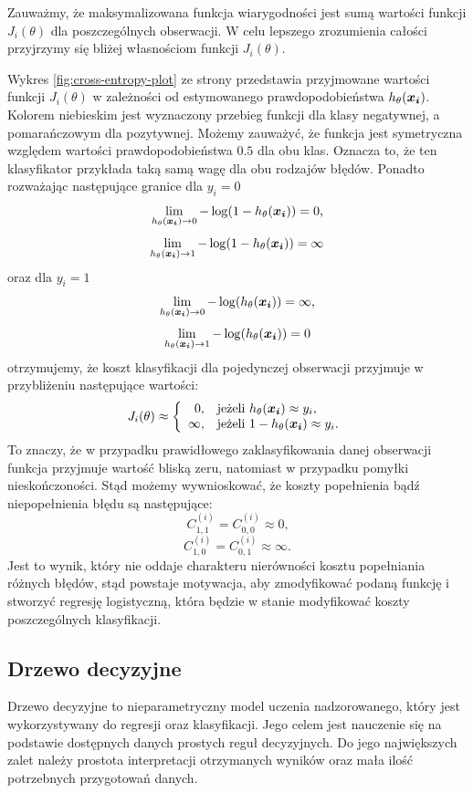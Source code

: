 \documentclass[inzynierska]{pwr_wmat_praca_dyplomowa}
\theoremstyle{plain}
\numberwithin{theorem}{chapter}
\theoremstyle{definition}
\numberwithin{theorem}{chapter}
\begin{document}
Zauważmy, że maksymalizowana funkcja wiarygodności jest sumą wartości funkcji $J_i(\theta)$ dla poszczególnych obserwacji. W celu lepszego zrozumienia całości przyjrzymy się bliżej własnościom funkcji $J_i(\theta)$.

Wykres \ref{fig:cross-entropy-plot} ze strony \pageref{fig:cross-entropy-plot} przedstawia przyjmowane wartości funkcji $J_i(\theta)$ w zależności od estymowanego prawdopodobieństwa $h_{\theta}(\boldsymbol{x_i})$. Kolorem niebieskim jest wyznaczony przebieg funkcji dla klasy negatywnej, a pomarańczowym dla pozytywnej. Możemy zauważyć, że funkcja jest symetryczna względem wartości prawdopodobieństwa $0.5$ dla obu klas. Oznacza to, że ten klasyfikator przykłada taką samą wagę dla obu rodzajów błędów. Ponadto rozważając następujące granice dla $y_i=0$
$$ \lim\limits_{h_{\theta}(\boldsymbol{x_i})\to 0} -\log(1-h_{\theta}(\boldsymbol{x_i})) = 0 \text{,}$$
$$ \lim\limits_{h_{\theta}(\boldsymbol{x_i})\to 1} -\log(1-h_{\theta}(\boldsymbol{x_i})) = \infty $$
oraz dla $y_i=1$
$$ \lim\limits_{h_{\theta}(\boldsymbol{x_i})\to 0} -\log(h_{\theta}(\boldsymbol{x_i})) = \infty \text{,}$$
$$ \lim\limits_{h_{\theta}(\boldsymbol{x_i})\to 1} -\log(h_{\theta}(\boldsymbol{x_i})) = 0 $$
otrzymujemy, że koszt klasyfikacji dla pojedynczej obserwacji przyjmuje w przybliżeniu następujące wartości:
$$
J_i(\theta) \approx \left\{
\begin{array}{rl}
0, &\mbox{jeżeli $h_{\theta}(\boldsymbol{x_i}) \approx y_i$}, \\
\infty, &\mbox{jeżeli $1 - h_{\theta}(\boldsymbol{x_i}) \approx y_i$}.
\end{array}{}
\right.
$$
To znaczy, że w przypadku prawidłowego zaklasyfikowania danej obserwacji funkcja przyjmuje wartość bliską zeru, natomiast w przypadku pomyłki nieskończoności. Stąd możemy wywnioskować, że koszty popełnienia bądź niepopełnienia błędu są następujące:
$$ C^{(i)}_{1,1} = C^{(i)}_{0,0} \approx 0 \text{,}$$
$$ C^{(i)}_{1,0} = C^{(i)}_{0,1} \approx \infty \text{.}$$
Jest to wynik, który nie oddaje charakteru nierówności kosztu popełniania różnych błędów, stąd powstaje motywacja, aby zmodyfikować podaną funkcję i stworzyć regresję logistyczną, która będzie w stanie modyfikować koszty poszczególnych klasyfikacji.

\subsection{Drzewo decyzyjne}
\label{drzewo}
Drzewo decyzyjne to nieparametryczny model uczenia nadzorowanego, który jest wykorzystywany do regresji oraz klasyfikacji. Jego celem jest nauczenie się na podstawie dostępnych danych prostych reguł decyzyjnych. Do jego największych zalet należy prostota interpretacji otrzymanych wyników oraz mała ilość potrzebnych przygotowań danych.
\end{document}
